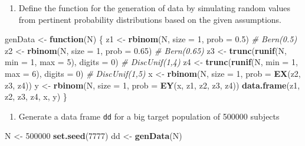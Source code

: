 \documentclass[
]{book}
\newenvironment{Shaded}{\begin{snugshade}}{\end{snugshade}}
\newcommand{\AttributeTok}[1]{\textcolor[rgb]{0.13,0.29,0.53}{#1}}
\newcommand{\CommentTok}[1]{\textcolor[rgb]{0.56,0.35,0.01}{\textit{#1}}}
\newcommand{\ControlFlowTok}[1]{\textcolor[rgb]{0.13,0.29,0.53}{\textbf{#1}}}
\newcommand{\DecValTok}[1]{\textcolor[rgb]{0.00,0.00,0.81}{#1}}
\newcommand{\FloatTok}[1]{\textcolor[rgb]{0.00,0.00,0.81}{#1}}
\newcommand{\FunctionTok}[1]{\textcolor[rgb]{0.13,0.29,0.53}{\textbf{#1}}}
\newcommand{\NormalTok}[1]{#1}
\newcommand{\OtherTok}[1]{\textcolor[rgb]{0.56,0.35,0.01}{#1}}
\providecommand{\tightlist}{%
  \setlength{\itemsep}{0pt}\setlength{\parskip}{0pt}}
\begin{document}
\begin{enumerate}
\def\labelenumi{\arabic{enumi}.}
\setcounter{enumi}{2}
\tightlist
\item
  Define the function for the generation of data
  by simulating random values from pertinent probability distributions
  based on the given assumptions.
\end{enumerate}

\begin{Shaded}
\begin{Highlighting}[]
\NormalTok{genData }\OtherTok{\textless{}{-}} \ControlFlowTok{function}\NormalTok{(N) \{}
\NormalTok{  z1 }\OtherTok{\textless{}{-}} \FunctionTok{rbinom}\NormalTok{(N, }\AttributeTok{size =} \DecValTok{1}\NormalTok{, }\AttributeTok{prob =} \FloatTok{0.5}\NormalTok{) }\CommentTok{\# Bern(0.5)}
\NormalTok{  z2 }\OtherTok{\textless{}{-}} \FunctionTok{rbinom}\NormalTok{(N, }\AttributeTok{size =} \DecValTok{1}\NormalTok{, }\AttributeTok{prob =} \FloatTok{0.65}\NormalTok{) }\CommentTok{\# Bern(0.65)}
\NormalTok{  z3 }\OtherTok{\textless{}{-}} \FunctionTok{trunc}\NormalTok{(}\FunctionTok{runif}\NormalTok{(N, }\AttributeTok{min =} \DecValTok{1}\NormalTok{, }\AttributeTok{max =} \DecValTok{5}\NormalTok{), }\AttributeTok{digits =} \DecValTok{0}\NormalTok{) }\CommentTok{\# DiscUnif(1,4)}
\NormalTok{  z4 }\OtherTok{\textless{}{-}} \FunctionTok{trunc}\NormalTok{(}\FunctionTok{runif}\NormalTok{(N, }\AttributeTok{min =} \DecValTok{1}\NormalTok{, }\AttributeTok{max =} \DecValTok{6}\NormalTok{), }\AttributeTok{digits =} \DecValTok{0}\NormalTok{) }\CommentTok{\# DiscUnif(1,5)}
\NormalTok{  x }\OtherTok{\textless{}{-}} \FunctionTok{rbinom}\NormalTok{(N, }\AttributeTok{size =} \DecValTok{1}\NormalTok{, }\AttributeTok{prob =} \FunctionTok{EX}\NormalTok{(z2, z3, z4))}
\NormalTok{  y }\OtherTok{\textless{}{-}} \FunctionTok{rbinom}\NormalTok{(N, }\AttributeTok{size =} \DecValTok{1}\NormalTok{, }\AttributeTok{prob =} \FunctionTok{EY}\NormalTok{(x, z1, z2, z3, z4))}
  \FunctionTok{data.frame}\NormalTok{(z1, z2, z3, z4, x, y)}
\NormalTok{\}}
\end{Highlighting}
\end{Shaded}

\begin{enumerate}
\def\labelenumi{\arabic{enumi}.}
\setcounter{enumi}{3}
\tightlist
\item
  Generate a data frame \texttt{dd} for a big target population of 500000 subjects
\end{enumerate}

\begin{Shaded}
\begin{Highlighting}[]
\NormalTok{N }\OtherTok{\textless{}{-}} \DecValTok{500000}
\FunctionTok{set.seed}\NormalTok{(}\DecValTok{7777}\NormalTok{)}
\NormalTok{dd }\OtherTok{\textless{}{-}} \FunctionTok{genData}\NormalTok{(N)}
\end{Highlighting}
\end{Shaded}
\end{document}

